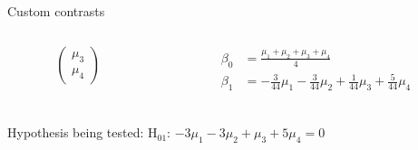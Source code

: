 \documentclass[aspectratio=169]{beamer}
\begin{document}
\begin{frame}{Custom contrasts}
\begin{columns}
\begin{column}[t]{.5\textwidth}
\[\begin{pmatrix}
    \mu_3 \\
    \mu_4
  \end{pmatrix}
\]
    \end{column}
    \begin{column}[t]{.5\textwidth}
\begin{align*}
  \beta_0 & = \frac{\mu_1 + \mu_2 + \mu_3 + \mu_4}{4} \\
  \beta_1 & = -\frac{3}{44}\mu_1 - \frac{3}{44}\mu_2 + \frac{1}{44}\mu_3 +
  \frac{5}{44}\mu_4 \\
\end{align*}
    \end{column}
  \end{columns}
Hypothesis being tested:
H$_{01}$: $-3\mu_1 - 3\mu_2 + \mu_3 + 5\mu_4 = 0$
\end{frame}
\end{document}
